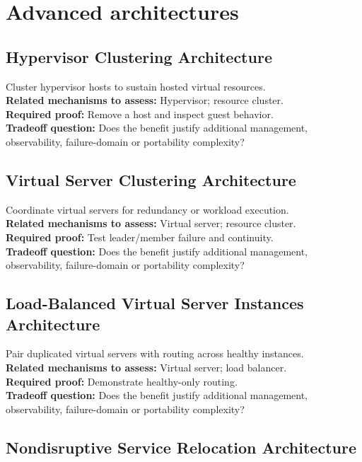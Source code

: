 \documentclass[10pt,letterpaper]{article}
\begin{document}
\section{Advanced architectures}
\subsection{Hypervisor Clustering Architecture}
Cluster hypervisor hosts to sustain hosted virtual resources.\\[3pt]
\textbf{Related mechanisms to assess:} Hypervisor; resource cluster.\\[3pt]
\textbf{Required proof:} Remove a host and inspect guest behavior.\\[3pt]
\textbf{Tradeoff question:} Does the benefit justify additional management, observability, failure-domain or portability complexity?\\[3pt]
\subsection{Virtual Server Clustering Architecture}
Coordinate virtual servers for redundancy or workload execution.\\[3pt]
\textbf{Related mechanisms to assess:} Virtual server; resource cluster.\\[3pt]
\textbf{Required proof:} Test leader/member failure and continuity.\\[3pt]
\textbf{Tradeoff question:} Does the benefit justify additional management, observability, failure-domain or portability complexity?\\[3pt]
\subsection{Load-Balanced Virtual Server Instances Architecture}
Pair duplicated virtual servers with routing across healthy instances.\\[3pt]
\textbf{Related mechanisms to assess:} Virtual server; load balancer.\\[3pt]
\textbf{Required proof:} Demonstrate healthy-only routing.\\[3pt]
\textbf{Tradeoff question:} Does the benefit justify additional management, observability, failure-domain or portability complexity?\\[3pt]
\subsection{Nondisruptive Service Relocation Architecture}
\end{document}
